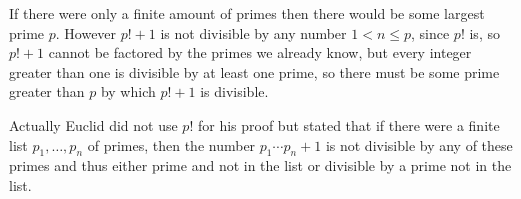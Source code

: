 \documentclass[12pt]{article}
\begin{document}
If there were only a finite amount of primes then there would be some largest prime $p$. However $p!+1$ is not divisible by any number $1<n\leq p$, since $p!$ is, so $p!+1$ cannot be factored by the primes we already know, but every integer greater than one is divisible by at least one prime, so there must be some prime greater than $p$ by which $p!+1$ is divisible.

Actually Euclid did not use $p!$ for his proof but stated that if there were a finite list $p_1,\ldots,p_n$ of primes, then the number $p_1\cdots p_n+1$ is not divisible by any of these primes and thus either prime and not in the list or divisible by a prime not in the list.
\end{document}
